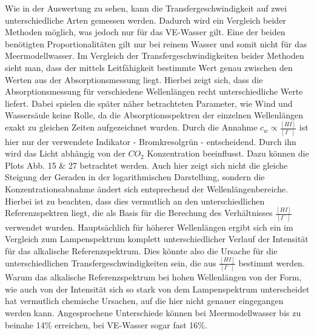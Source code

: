 \documentclass[12pt]{article}
\begin{document}
Wie in der Auswertung zu sehen, kann die Transfergeschwindigkeit auf zwei unterschiedliche Arten gemessen werden. Dadurch wird ein Vergleich beider Methoden möglich, was jedoch nur für das VE-Wasser gilt. Eine der beiden benötigten Proportionalitäten gilt nur bei reinem Wasser und somit nicht für das Meermodellwasser. 
Im Vergleich der Transfergeschwindigkeiten beider Methoden sieht man, dass der mittels Leitfähigkeit bestimmte Wert genau zwischen den Werten aus der Absorptionsmessung liegt. Hierbei zeigt sich, dass die Absorptionsmessung für verschiedene Wellenlängen recht unterschiedliche Werte liefert. Dabei spielen die später näher betrachteten Parameter, wie Wind und Wassersäule keine Rolle, da die Absorptionsspektren der einzelnen Wellenlängen exakt zu gleichen Zeiten aufgezeichnet wurden. 
Durch die Annahme $c_w \propto \frac{[HI]}{[I^-]}$ ist hier nur der verwendete Indikator - Bromkresolgrün - entscheidend. Durch ihn wird das Licht abhängig von der $CO_2$ Konzentration beeinflusst.  Dazu können die Plots Abb. 15 \& 27 betrachtet werden. Auch hier zeigt sich nicht die gleiche Steigung der Geraden in der logarithmischen Darstellung, sondern die Konzentrationsabnahme ändert sich entsprechend der Wellenlängenbereiche. Hierbei ist zu beachten, dass dies vermutlich an den unterschiedlichen Referenzspektren liegt, die als Basis für die Berechung des Verhältnisses $\frac{[HI]}{[I^-]}$ verwendet wurden. Hauptsächlich für höherer Wellenlängen ergibt sich ein im Vergleich zum Lampenspektrum komplett unterschiedlicher Verlauf der Intensität für das alkalische Referenzspektrum. Dies könnte also die Ursache für die unterschiedlichen Transfergeschwindigkeiten sein, die aus $\frac{[HI]}{[I^-]}$ bestimmt werden. Warum das alkalische Referenzspektrum bei hohen Wellenlängen von der Form, wie auch von der Intensität sich so stark von dem Lampenspektrum unterscheidet hat vermutlich chemische Ursachen, auf die hier nicht genauer eingegangen werden kann. Angesprochene Unterschiede können bei Meermodellwasser bis zu beinahe 14\% erreichen, bei VE-Wasser sogar fast 16\%.
\end{document}
